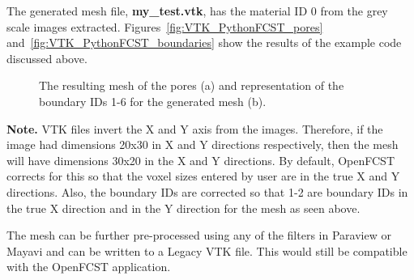 The generated mesh file, \textbf{my\_test.vtk}, has the material ID 0 from the grey scale images extracted. Figures~\ref{fig:VTK_PythonFCST_pores} and~\ref{fig:VTK_PythonFCST_boundaries} show the results of the example code discussed above.

\begin{figure}[h]
\centering
\captionsetup{justification=centering}
\quad
{}
\caption{The resulting mesh of the pores (a) and representation of the boundary IDs 1-6 for the generated mesh (b).}
\label{fig:VTK_PythonFCST_pores_and_boundaries}
\end{figure}

\bigskip

\noindent\textbf{Note.} VTK files invert the X and Y axis from the images. Therefore, if the image had dimensions 20x30 in X and Y directions respectively, then the mesh will have dimensions 30x20 in the X and Y directions. By default, OpenFCST corrects for this so that the voxel sizes entered by user are in the true X and Y directions. Also, the boundary IDs are corrected so that 1-2 are boundary IDs in the true X direction and in the Y direction for the mesh as seen above.

The mesh can be further pre-processed using any of the filters in Paraview or Mayavi and can be written to a Legacy VTK file. This would still be compatible with the OpenFCST application.


